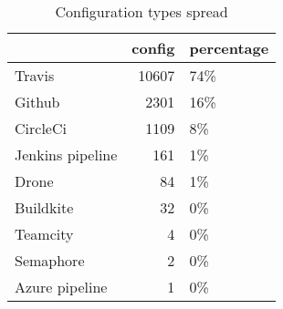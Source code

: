\begin {table}[!htbp]

\caption{Configuration types spread}
\label{table_config_types}
\begin{tabular}{|l|r|l|}
\hline
{} &  config & percentage \\ \hline

Travis          &   10607 &        74\% \\ \hline
Github          &    2301 &        16\% \\ \hline
CircleCi        &    1109 &         8\% \\ \hline
Jenkins pipeline &     161 &         1\% \\ \hline
Drone           &      84 &         1\% \\ \hline
Buildkite       &      32 &         0\% \\ \hline
Teamcity        &       4 &         0\% \\ \hline
Semaphore       &       2 &         0\% \\ \hline
Azure pipeline           &       1 &         0\% \\ \hline

\end{tabular}
\end{table}

